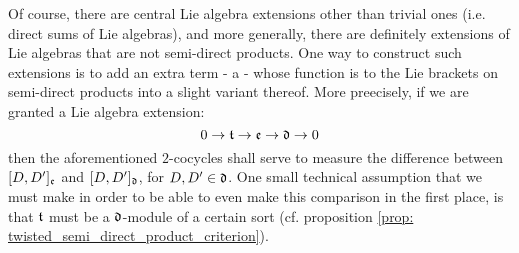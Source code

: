         Of course, there are central Lie algebra extensions other than trivial ones (i.e. direct sums of Lie algebras), and more generally, there are definitely extensions of Lie algebras that are not semi-direct products. One way to construct such extensions is to add an extra term - a  - whose function is to  the Lie brackets on semi-direct products into a slight variant thereof. More preecisely, if we are granted a Lie algebra extension:
            $$0 \to \mathfrak{t} \to \mathfrak{e} \to \mathfrak{d} \to 0$$
        then the aforementioned $2$-cocycles shall serve to measure the difference between $[D, D']_{\mathfrak{e}}$ and $[D, D']_{\mathfrak{d}}$, for $D, D' \in \mathfrak{d}$. One small technical assumption that we must make in order to be able to even make this comparison in the first place, is that $\mathfrak{t}$ must be a $\mathfrak{d}$-module of a certain sort (cf. proposition \ref{prop: twisted_semi_direct_product_criterion}).

